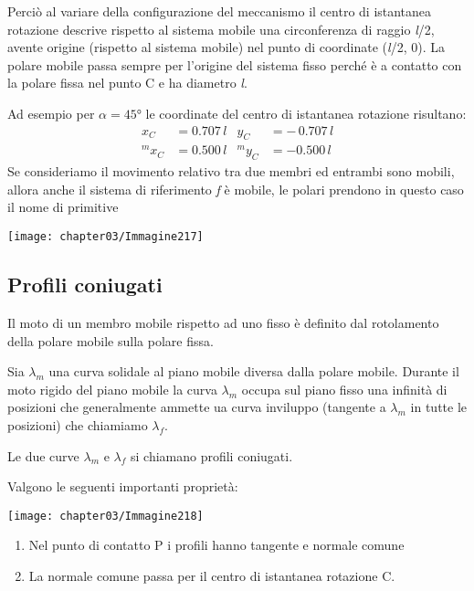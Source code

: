 \begin{minipage}{.5\textwidth}
Perciò al variare della configurazione del meccanismo il centro di istantanea rotazione descrive rispetto al sistema mobile una circonferenza di raggio \emph{l}/2, avente origine (rispetto al sistema mobile) nel punto di coordinate (\emph{l}/2, 0). La polare mobile passa sempre per l'origine del sistema fisso perché è a contatto con la polare fissa nel punto C e ha diametro \emph{l}.

Ad esempio per $\alpha=45$° le coordinate del centro di istantanea rotazione risultano:
\begin{align*}
x_C&=0.707\,l&y_C&=-\,0.707\,l\\
^mx_C&=0.500\,l&^my_C&=-0.500\,l
\end{align*}
Se consideriamo il movimento relativo tra due membri ed entrambi sono mobili, allora anche il sistema di riferimento \emph{f} è mobile, le polari prendono in questo caso il nome di primitive
\end{minipage}
\hfill
\begin{minipage}{.5\textwidth}
\centering
\texttt{[image: chapter03/Immagine217]}
\end{minipage}

\subsection{Profili coniugati}

\begin{minipage}{.6\textwidth}
Il moto di un membro mobile rispetto ad uno fisso è definito dal rotolamento della polare mobile sulla polare fissa.

Sia $\lambda_m$ una curva solidale al piano mobile diversa dalla polare mobile. Durante il moto rigido del piano mobile la curva $\lambda_m$ occupa sul piano fisso una infinità di posizioni che generalmente ammette ua curva inviluppo (tangente a $\lambda_m$ in tutte le posizioni) che chiamiamo $\lambda_f$.

Le due curve $\lambda_m$ e $\lambda_f$ si chiamano profili coniugati.

Valgono le seguenti importanti proprietà:
\end{minipage}
\hfill
\begin{minipage}{.4\textwidth}
\centering
\texttt{[image: chapter03/Immagine218]}
\end{minipage}


\begin{enumerate}[$\rightarrow$]
\item Nel punto di contatto P i profili hanno tangente e normale comune
\item La normale comune passa per il centro di istantanea rotazione C.
\end{enumerate}

